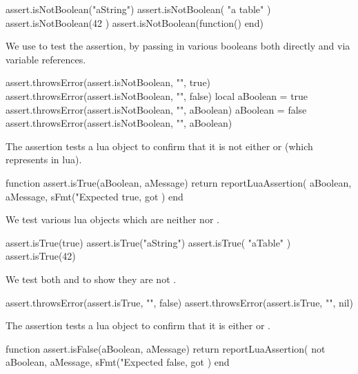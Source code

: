 \startLuaTest
  assert.isNotBoolean("aString")
  assert.isNotBoolean({ "a table" })
  assert.isNotBoolean(42 )
  assert.isNotBoolean(function() end)
\stopLuaTest
\stopTestCase


We use  to test the  
assertion, by passing in various booleans both directly and via variable 
references. 

\startLuaTest
  assert.throwsError(assert.isNotBoolean, "", true)
  assert.throwsError(assert.isNotBoolean, "", false)
  local aBoolean = true
  assert.throwsError(assert.isNotBoolean, "", aBoolean)
  aBoolean = false
  assert.throwsError(assert.isNotBoolean, "", aBoolean)
\stopLuaTest
\stopTestCase

\stopTestSuite


The  assertion tests a lua object to confirm that it 
is not either  or  (which represents  
in lua). 

\startLuaCode
function assert.isTrue(aBoolean, aMessage)
  return reportLuaAssertion(
    aBoolean,
    aMessage,
    sFmt("Expected true, got %
  )
end
\stopLuaCode


We test various lua objects which are neither  nor . 

\startLuaTest
  assert.isTrue(true)
  assert.isTrue("aString")
  assert.isTrue({ "aTable" })
  assert.isTrue(42)
\stopLuaTest
\stopTestCase


We test both  and  to show they are not 
. 

\startLuaTest
  assert.throwsError(assert.isTrue, "", false)
  assert.throwsError(assert.isTrue, "", nil)
\stopLuaTest
\stopTestCase

\stopTestSuite


The  assertion tests a lua object to confirm that it 
is either  or . 

\startLuaCode
function assert.isFalse(aBoolean, aMessage)
  return reportLuaAssertion(
    not aBoolean,
    aMessage,
    sFmt("Expected false, got %
  )
end
\stopLuaCode

